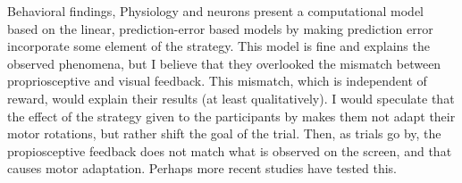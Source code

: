 \documentclass{report}
\begin{document}
\begin{chapter}{Behavioral findings, Physiology and neurons}
\cite{Taylor_Flexible_2011} present a computational model based on the linear,
prediction-error based models \citep[e.g.][]{Smith_Interacting_2006} by making
prediction error incorporate some element of the strategy. This model is fine
and explains the observed phenomena, but I believe that they overlooked the
mismatch between propriosceptive and visual feedback. This mismatch, which is
independent of reward, would explain their results (at least qualitatively). I
would speculate that the effect of the strategy given to the participants by
\cite{Taylor_Flexible_2011} makes them not adapt their motor rotations, but
rather shift the goal of the trial. Then, as trials go by, the propiosceptive
feedback does not match what is observed on the screen, and that causes motor
adaptation. Perhaps more recent studies have tested this.


\end{chapter}
\end{document}
